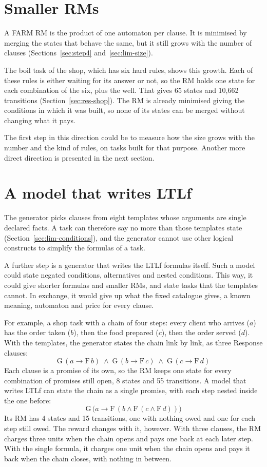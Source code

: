 \documentclass[11pt,english,listoffigures,listoftables]{tfgetsinf}
\begin{document}
\section{Smaller RMs}
\label{sec:fw-size}
A FARM RM is the product of one automaton per clause. It is minimised by merging the states that behave the same, but it still grows with the number of clauses (Sections~\ref{sec:step4} and~\ref{sec:lim-size}).

The boil task of the shop, which has six hard rules, shows this growth. Each of these rules is either waiting for its answer or not, so the RM holds one state for each combination of the six, plus the well. That gives 65 states and 10,662 transitions (Section~\ref{sec:res-shop}). The RM is already minimised giving the conditions in which it was built, so none of its states can be merged without changing what it pays.

The first step in this direction could be to measure how the size grows with the number and the kind of rules, on tasks built for that purpose. Another more direct direction is presented in the next section. 

\section{A model that writes LTLf}
\label{sec:fw-ltlf}
The generator picks clauses from eight templates whose arguments are single declared facts. A task can therefore say no more than those templates state (Section~\ref{sec:lim-conditions}), and the generator cannot use other logical constructs to simplify the formulas of a task.

A further step is a generator that writes the LTLf formulas itself. Such a model could state negated conditions, alternatives and nested conditions. This way, it could give shorter formulas and smaller RMs, and state tasks that the templates cannot. In exchange, it would give up what the fixed catalogue gives, a known meaning, automaton and price for every clause. 

For example, a shop task with a chain of four steps: every client who arrives ($a$) has the order taken ($b$), then the food prepared ($c$), then the order served ($d$). With the templates, the generator states the chain link by link, as three Response clauses:
\[
\mathrm{G}\,(a \rightarrow \mathrm{F}\,b) \;\wedge\; \mathrm{G}\,(b \rightarrow \mathrm{F}\,c) \;\wedge\; \mathrm{G}\,(c \rightarrow \mathrm{F}\,d)
\]
Each clause is a promise of its own, so the RM keeps one state for every combination of promises still open, 8 states and 55 transitions. A model that writes LTLf can state the chain as a single promise, with each step nested inside the one before:
\[
\mathrm{G}\,\bigl(a \rightarrow \mathrm{F}\,(b \wedge \mathrm{F}\,(c \wedge \mathrm{F}\,d))\bigr)
\]
Its RM has 4 states and 15 transitions, one with nothing owed and one for each step still owed. The reward changes with it, however. With three clauses, the RM charges three units when the chain opens and pays one back at each later step. With the single formula, it charges one unit when the chain opens and pays it back when the chain closes, with nothing in between.
\end{document}
